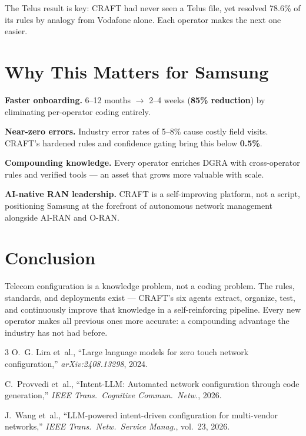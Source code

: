 \documentclass[10.5pt]{article}
\begin{document}
The Telus result is key: CRAFT had never seen a Telus file, yet resolved 78.6\% of its rules by analogy from Vodafone alone. Each operator makes the next one easier.

\section{Why This Matters for Samsung}

\textbf{Faster onboarding.} 6--12 months $\rightarrow$ 2--4 weeks (\textbf{85\% reduction}) by eliminating per-operator coding entirely.

\textbf{Near-zero errors.} Industry error rates of 5--8\% cause costly field visits. CRAFT's hardened rules and confidence gating bring this below \textbf{0.5\%}.

\textbf{Compounding knowledge.} Every operator enriches DGRA with cross-operator rules and verified tools --- an asset that grows more valuable with scale.

\textbf{AI-native RAN leadership.} CRAFT is a self-improving platform, not a script, positioning Samsung at the forefront of autonomous network management alongside AI-RAN and O-RAN.

\section{Conclusion}

Telecom configuration is a knowledge problem, not a coding problem. The rules, standards, and deployments exist --- CRAFT's six agents extract, organize, test, and continuously improve that knowledge in a self-reinforcing pipeline. Every new operator makes all previous ones more accurate: a compounding advantage the industry has not had before.

\begin{thebibliography}{3}
\small
{}
O.~G. Lira et~al., ``Large language models for zero touch network configuration,'' \emph{arXiv:2408.13298}, 2024.

C.~Provvedi et~al., ``Intent-LLM: Automated network configuration through code generation,'' \emph{IEEE Trans.\ Cognitive Commun.\ Netw.}, 2026.

J.~Wang et~al., ``LLM-powered intent-driven configuration for multi-vendor networks,'' \emph{IEEE Trans.\ Netw.\ Service Manag.}, vol.~23, 2026.
\end{thebibliography}
\end{document}
